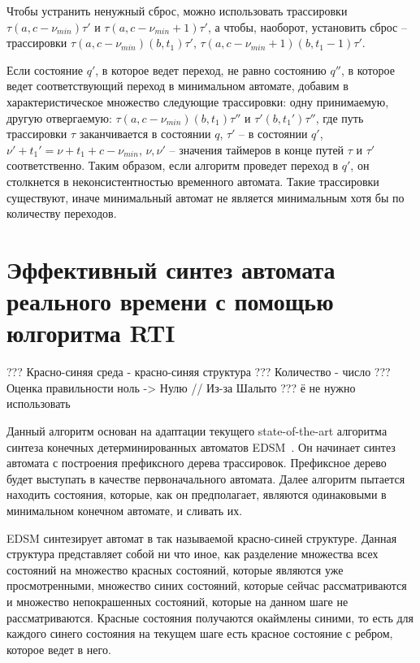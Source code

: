 \documentclass[times,specification,annotation]{itmo-student-thesis}
\begin{document}
Чтобы устранить ненужный сброс, можно использовать трассировки $\tau(a, c - \nu_{min})\tau'$ и $\tau(a, c - \nu_{min} + 1)\tau'$, а чтобы, наоборот, установить сброс -- трассировки
$\tau(a, c - \nu_{min})(b, t_1)\tau'$, $\tau(a, c - \nu_{min} + 1)(b, t_1 - 1)\tau'$.

Если состояние $q'$, в которое ведет переход, не равно состоянию $q''$, в которое ведет соответствующий переход в минимальном автомате, добавим в характеристическое множество следующие трассировки: одну
принимаемую, другую отвергаемую:
$\tau(a, c - \nu_{min})(b, t_1)\tau''$ и $\tau'(b, t_1')\tau''$, где путь трассировки $\tau$ заканчивается в состоянии $q$, $\tau'$ -- в состоянии $q'$, $\nu' + t_1' = \nu + t_1 + c - \nu_{min}$,
$\nu, \nu'$ -- значения таймеров в конце путей $\tau$ и $\tau'$ соответственно. Таким образом, если алгоритм проведет переход в $q'$, он столкнется в неконсистентностью временного автомата.
Такие трассировки существуют, иначе минимальный автомат не является минимальным хотя бы по количеству переходов.

\section{Эффективный синтез автомата реального времени с помощью юлгоритма RTI}

??? Красно-синяя среда - красно-синяя структура
??? Количество - число
??? Оценка правильности ноль -> Нулю // Из-за Шалыто
??? ё не нужно использовать

Данный алгоритм основан на адаптации текущего state-of-the-art алгоритма синтеза конечных детерминированных автоматов EDSM~\cite{state-merging-dfa}. 
Он начинает синтез автомата с построения префиксного дерева трассировок. Префиксное дерево будет выступать в качестве первоначального автомата.
Далее алгоритм пытается находить состояния, которые, как он предполагает, являются одинаковыми в минимальном конечном автомате, и сливать их.

EDSM синтезирует автомат в так называемой красно-синей структуре. Данная структура представляет собой ни что иное, как разделение множества всех состояний на
множество красных состояний, которые являются уже просмотренными, множество синих состояний, которые сейчас рассматриваются и множество непокрашенных
состояний, которые на данном шаге не рассматриваются. Красные состояния получаются окаймлены синими, то есть
для каждого синего состояния на текущем шаге есть красное состояние с ребром, которое ведет в него.
\end{document}
